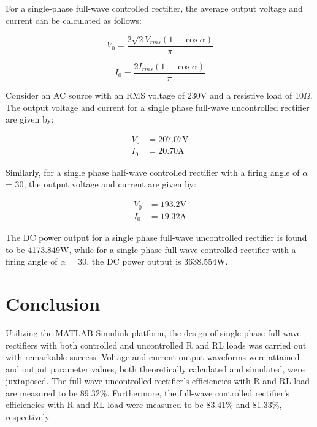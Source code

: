 For a single-phase full-wave controlled rectifier, the average output voltage and current can be calculated as follows:

\begin{equation}
    V_0 = \frac{2\sqrt{2}V_{rms}(1-\cos\alpha)}{\pi}
\end{equation}

\begin{equation}
    I_0 = \frac{2I_{rms}(1-\cos\alpha)}{\pi}
\end{equation}

Consider an AC source with an RMS voltage of 230V and a resistive load of 10$ \Omega $. The output voltage and current for a single phase full-wave uncontrolled rectifier are given by:

\begin{align}
    V_{0} & = 207.07\mathrm{V} \\
    I_{0} & = 20.70\mathrm{A}
\end{align}

Similarly, for a single phase half-wave controlled rectifier with a firing angle of $ \alpha $  = 30, the output voltage and current are given by:

\begin{align}
    V_{0} & = 193.2\mathrm{V} \\
    I_{0} & = 19.32\mathrm{A}
\end{align}

The DC power output for a single phase full-wave uncontrolled rectifier is found to be 4173.849W, while for a single phase full-wave controlled rectifier with a firing angle of $ \alpha $ = 30, the DC power output is 3638.554W.

\pagebreak





\section{Conclusion}


\hspace{\parindent}

Utilizing the MATLAB Simulink platform, the design of single phase full wave rectifiers with both controlled and uncontrolled R and RL loads was carried out with remarkable success. Voltage and current output waveforms were attained and output parameter values, both theoretically calculated and simulated, were juxtaposed.
The full-wave uncontrolled rectifier's efficiencies with R and RL load are measured to be 89.32\%. Furthermore, the full-wave controlled rectifier's efficiencies with R and RL load were measured to be 83.41\% and 81.33\%, respectively.

